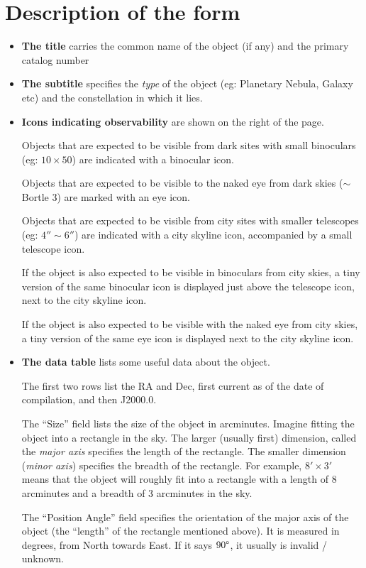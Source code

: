 \section{Description of the form}
\begin{itemize}
\item \textbf{The title} carries the common name of the object (if
  any) and the primary catalog number
\item \textbf{The subtitle} specifies the \emph{type} of the object
  (eg: Planetary Nebula, Galaxy etc) and the constellation in which it
  lies.
\item \textbf{Icons indicating observability} are shown on the right
  of the page.

  Objects that are expected to be visible from dark sites with small
  binoculars (eg: $10 \times 50$) are indicated with a binocular
  icon.

  Objects that are expected to be visible to the naked eye from dark
  skies ($\sim$ Bortle 3) are marked with an eye icon.

  Objects that are expected to be visible from city sites with smaller
  telescopes (eg: $4'' \sim 6''$) are indicated with a city skyline
  icon, accompanied by a small telescope icon.

  If the object is also expected to be visible in binoculars from city
  skies, a tiny version of the same binocular icon is displayed just
  above the telescope icon, next to the city skyline icon.

  If the object is also expected to be visible with the naked eye from
  city skies, a tiny version of the same eye icon is displayed next to
  the city skyline icon.

\item \textbf{The data table} lists some useful data about the
  object.

  The first two rows list the RA and Dec, first current as of the date
  of compilation, and then J2000.0.

  The ``Size'' field lists the size of the object in
  arcminutes. Imagine fitting the object into a rectangle in the
  sky. The larger (usually first) dimension, called the \emph{major
    axis} specifies the length of the rectangle. The smaller dimension
  (\emph{minor axis}) specifies the breadth of the rectangle. For
  example, $8' \times 3'$ means that the object will roughly fit into
  a rectangle with a length of $8$ arcminutes and a breadth of $3$
  arcminutes in the sky.

  The ``Position Angle'' field specifies the orientation of the major
  axis of the object (the ``length'' of the rectangle mentioned
  above). It is measured in degrees, from North towards East. If it
  says $90\degree$, it usually is invalid / unknown.


\end{itemize}
